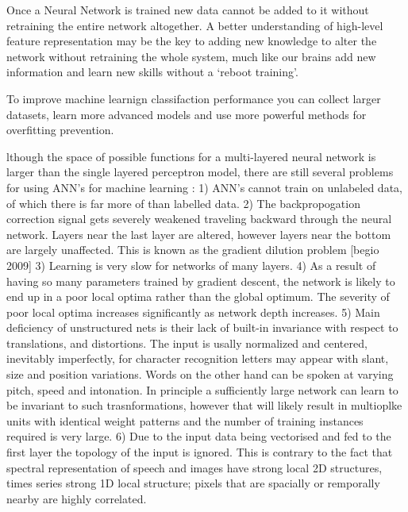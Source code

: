 Once a Neural Network is trained new data cannot be added to it without retraining the entire network altogether. 
A better understanding of high-level feature representation may be the key to adding new knowledge to alter the network without retraining the whole system, much like our brains add new information and learn new skills without a `reboot training'.

To improve machine learnign classifaction performance you can collect larger datasets, learn more advanced models and use more powerful methods for overfitting prevention\citep{krizhevsky2012imagenet}.


lthough the space of possible functions for a multi-layered neural network is larger than the single layered perceptron model, there are still several problems for using ANN's for machine learning  \citep{mo2012survey}:
1) ANN's cannot train on unlabeled data, of which there is far more of than labelled data.
2) The backpropogation correction signal gets severely weakened traveling backward through the neural network. Layers near the last layer are altered, however layers near the bottom are largely unaffected. This is known as the gradient dilution problem [begio 2009]
3) Learning is very slow for networks of many layers.
4) As a result of having so many parameters trained by gradient descent, the network is likely to end up in a poor local optima rather than the global optimum.
The severity of poor local optima increases significantly as network depth increases\citep{dengthree}.
5) Main deficiency of unstructured nets is their lack of built-in invariance with respect to translations, and distortions\citep{lecun1995convolutional}.
The input is usally normalized and centered, inevitably imperfectly, for character recognition letters may appear with slant, size and position variations.
Words on the other hand can be spoken at varying pitch, speed and intonation.
In principle a sufficiently large network can learn to be invariant to such trasnformations, however that will likely result in multioplke units with identical weight patterns and the number of training instances required is very large\citep{lecun1995convolutional}.
6) Due to the input data being vectorised and fed to the first layer the topology of the input is ignored.
This is contrary to the fact that spectral representation of speech and images have strong local 2D structures, times series strong 1D local structure; pixels that are spacially or remporally nearby are highly correlated\citep{lecun1995convolutional}. 



